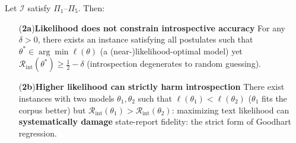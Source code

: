 \begin{theorem}\label{thm:goodhart}
Let $\mathcal{I}$ satisfy $\Pi_1$--$\Pi_5$. Then:

\begin{enumerate}[align=left, labelwidth=!, labelsep=0.8em, leftmargin=!, itemindent=0pt]
\item[(\textbf{2a})\textbf{Likelihood does not constrain introspective accuracy}] For any
$\delta > 0$, there exists an instance satisfying all postulates such that
$\theta^{*} \in \arg\min \ell(\theta)$ (a (near-)likelihood-optimal model) yet
$\mathcal{R}_{\mathrm{int}}(\theta^{*}) \ge \tfrac12 - \delta$ (introspection degenerates to
random guessing).
\item[(\textbf{2b})\textbf{Higher likelihood can strictly harm introspection}] There exist
instances with two models $\theta_1, \theta_2$ such that $\ell(\theta_1) < \ell(\theta_2)$
($\theta_1$ fits the corpus better) but
$\mathcal{R}_{\mathrm{int}}(\theta_1) > \mathcal{R}_{\mathrm{int}}(\theta_2)$: maximizing
text likelihood can \textbf{systematically damage} state-report fidelity: the strict form
of Goodhart regression.
\end{enumerate}
\end{theorem}

